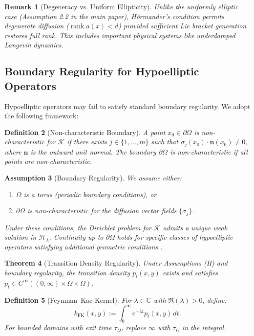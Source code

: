 \documentclass[11pt,a4paper]{article}
\newtheorem{theorem}{Theorem}[section]
\newtheorem{definition}[theorem]{Definition}
\newtheorem{remark}[theorem]{Remark}
\newtheorem{assumption}[theorem]{Assumption}
\begin{document}
\begin{remark}[Degeneracy vs. Uniform Ellipticity]
Unlike the uniformly elliptic case (Assumption 2.2 in the main paper), H\"{o}rmander's condition permits degenerate diffusion ($\operatorname{rank} a(x) < d$) provided sufficient Lie bracket generation restores full rank. This includes important physical systems like underdamped Langevin dynamics.
\end{remark}

\subsection{Boundary Regularity for Hypoelliptic Operators}
Hypoelliptic operators may fail to satisfy standard boundary regularity. We adopt the following framework:

\begin{definition}[Non-characteristic Boundary]
A point $x_0 \in \partial\Omega$ is \emph{non-characteristic} for $\mathcal{K}$ if there exists $j \in \{1,\dots,m\}$ such that $\sigma_j(x_0) \cdot \bm{n}(x_0) \neq 0$, where $\bm{n}$ is the outward unit normal. The boundary $\partial\Omega$ is non-characteristic if all points are non-characteristic.
\end{definition}

\begin{assumption}[Boundary Regularity]
We assume either:
\begin{enumerate}[label=(\roman*)]
    \item $\Omega$ is a torus (periodic boundary conditions), or
    \item $\partial\Omega$ is non-characteristic for the diffusion vector fields $\{\sigma_j\}$.
\end{enumerate}
Under these conditions, the Dirichlet problem for $\mathcal{K}$ admits a unique weak solution in $\mathcal{H}_\lambda$. Continuity up to $\partial\Omega$ holds for specific classes of hypoelliptic operators satisfying additional geometric conditions \cite{OleinikRadkevic1973}.
\end{assumption}

\begin{theorem}[Transition Density Regularity]
Under Assumptions (H) and boundary regularity, the transition density $p_t(x,y)$ exists and satisfies $p_t \in C^\infty((0,\infty) \times \Omega \times \Omega)$.
\end{theorem}

\begin{definition}[Feynman--Kac Kernel]
For $\lambda \in \mathbb{C}$ with $\Re(\lambda) > 0$, define:
\[
k_{\mathrm{FK}}(x,y) := \int_0^\infty e^{-\lambda t} p_t(x,y)\,dt.
\]
For bounded domains with exit time $\tau_\Omega$, replace $\infty$ with $\tau_\Omega$ in the integral.
\end{definition}
\end{document}
